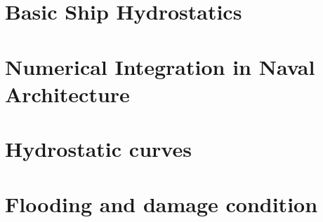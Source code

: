 \documentclass{report}
\begin{document}
 
\tableofcontents
\chapter{Basic Ship Hydrostatics}
\section{}
\chapter{Numerical Integration in Naval Architecture}
\chapter{Hydrostatic curves}
\chapter{Flooding and damage condition}
\end{document}
